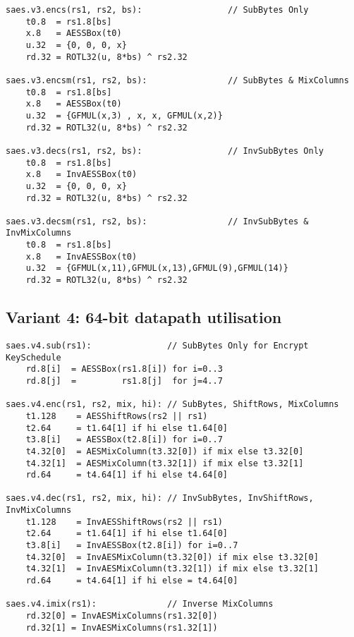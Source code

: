 \begin{lstlisting}[language=pseudo]
saes.v3.encs(rs1, rs2, bs):                 // SubBytes Only
    t0.8  = rs1.8[bs]
    x.8   = AESSBox(t0)
    u.32  = {0, 0, 0, x}
    rd.32 = ROTL32(u, 8*bs) ^ rs2.32

saes.v3.encsm(rs1, rs2, bs):                // SubBytes & MixColumns
    t0.8  = rs1.8[bs]
    x.8   = AESSBox(t0)
    u.32  = {GFMUL(x,3) , x, x, GFMUL(x,2)}
    rd.32 = ROTL32(u, 8*bs) ^ rs2.32

saes.v3.decs(rs1, rs2, bs):                 // InvSubBytes Only
    t0.8  = rs1.8[bs]
    x.8   = InvAESSBox(t0)
    u.32  = {0, 0, 0, x}
    rd.32 = ROTL32(u, 8*bs) ^ rs2.32

saes.v3.decsm(rs1, rs2, bs):                // InvSubBytes & InvMixColumns
    t0.8  = rs1.8[bs]
    x.8   = InvAESSBox(t0)
    u.32  = {GFMUL(x,11),GFMUL(x,13),GFMUL(9),GFMUL(14)}
    rd.32 = ROTL32(u, 8*bs) ^ rs2.32
\end{lstlisting}

\subsection{Variant 4: 64-bit datapath utilisation}

\begin{lstlisting}[language=pseudo]
saes.v4.sub(rs1):               // SubBytes Only for Encrypt KeySchedule
    rd.8[i]  = AESSBox(rs1.8[i]) for i=0..3
    rd.8[j]  =         rs1.8[j]  for j=4..7

saes.v4.enc(rs1, rs2, mix, hi): // SubBytes, ShiftRows, MixColumns
    t1.128    = AESShiftRows(rs2 || rs1)
    t2.64     = t1.64[1] if hi else t1.64[0]
    t3.8[i]   = AESSBox(t2.8[i]) for i=0..7
    t4.32[0]  = AESMixColumn(t3.32[0]) if mix else t3.32[0]
    t4.32[1]  = AESMixColumn(t3.32[1]) if mix else t3.32[1]
    rd.64     = t4.64[1] if hi else t4.64[0]

saes.v4.dec(rs1, rs2, mix, hi): // InvSubBytes, InvShiftRows, InvMixColumns
    t1.128    = InvAESShiftRows(rs2 || rs1)
    t2.64     = t1.64[1] if hi else t1.64[0]
    t3.8[i]   = InvAESSBox(t2.8[i]) for i=0..7
    t4.32[0]  = InvAESMixColumn(t3.32[0]) if mix else t3.32[0]
    t4.32[1]  = InvAESMixColumn(t3.32[1]) if mix else t3.32[1]
    rd.64     = t4.64[1] if hi else = t4.64[0]

saes.v4.imix(rs1):              // Inverse MixColumns
    rd.32[0] = InvAESMixColumns(rs1.32[0])
    rd.32[1] = InvAESMixColumns(rs1.32[1])
\end{lstlisting}

